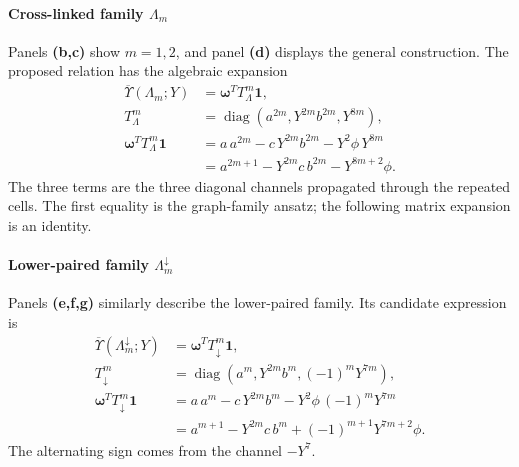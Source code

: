 \paragraph{Cross-linked family $\Lambda_m$}
\label{supp:transfer_crosslinked}
Panels \textbf{(b,c)} show $m=1,2$, and panel \textbf{(d)} displays the general construction. The proposed relation has the algebraic expansion
\begin{equation}
\begin{aligned}
\overline{\Upsilon}(\Lambda_m;Y)&=\bm\omega^TT_\Lambda^m\bm1,\\
T_\Lambda^m&=\operatorname{diag}(a^{2m},Y^{2m}b^{2m},Y^{8m}),\\
\bm\omega^TT_\Lambda^m\bm1
&=a\,a^{2m}-c\,Y^{2m}b^{2m}-Y^2\phi\,Y^{8m}\\
&=\boxed{a^{2m+1}-Y^{2m}c\,b^{2m}-Y^{8m+2}\phi}.
\end{aligned}
\label{supp:deriv:eq:lambda_family}
\end{equation}
The three terms are the three diagonal channels propagated through the repeated cells. The first equality is the graph-family ansatz; the following matrix expansion is an identity.

\paragraph{Lower-paired family $\Lambda_m^{\downarrow}$}
\label{supp:transfer_lower_paired}
Panels \textbf{(e,f,g)} similarly describe the lower-paired family. Its candidate expression is
\begin{equation}
\begin{aligned}
\overline{\Upsilon}(\Lambda_m^{\downarrow};Y)&=\bm\omega^TT_\downarrow^m\bm1,\\
T_\downarrow^m&=\operatorname{diag}(a^m,Y^{2m}b^m,(-1)^mY^{7m}),\\
\bm\omega^TT_\downarrow^m\bm1
&=a\,a^m-c\,Y^{2m}b^m-Y^2\phi\,(-1)^mY^{7m}\\
&=\boxed{a^{m+1}-Y^{2m}c\,b^m+(-1)^{m+1}Y^{7m+2}\phi}.
\end{aligned}
\label{supp:deriv:eq:down_family}
\end{equation}
The alternating sign comes from the channel $-Y^7$.

